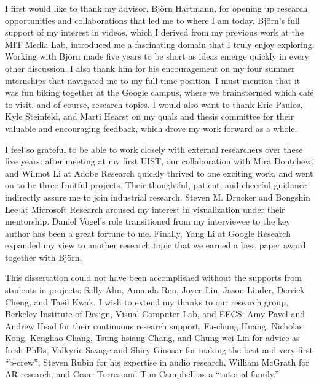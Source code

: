 \begin{acknowledgements}

%
I first would like to thank my advisor, Bj\"orn Hartmann, for opening up research opportunities and collaborations that led me to where I am today.
%
Bj\"orn's full support of my interest in videos, which I derived from my previous work at the MIT Media Lab, introduced me a fascinating domain that I truly enjoy exploring. Working with Bj\"orn made five years to be short as ideas emerge quickly in every other discussion. I also thank him for his encouragement on my four summer internships that navigated me to my full-time position. I must mention that it was fun biking together at the Google campus, where we brainstormed which caf\'{e} to visit, and of course, research topics.
I would also want to thank Eric Paulos, Kyle Steinfeld, and Marti Hearst on my quals and thesis committee for their valuable and encouraging feedback, which drove my work forward as a whole.

I feel so grateful to be able to work closely with external researchers over these five years: after meeting at my first UIST, our collaboration with Mira Dontcheva and Wilmot Li at Adobe Research quickly thrived to one exciting work, and went on to be three fruitful projects. Their thoughtful, patient, and cheerful guidance indirectly assure me to join industrial research.
%
Steven M. Drucker and Bongshin Lee at Microsoft Research aroused my interest in visualization under their mentorship.
%
Daniel Vogel's role transitioned from my interviewee to the key author has been a great fortune to me.
%
Finally, Yang Li at Google Research expanded my view to another research topic that we earned a best paper award together with Bj\"orn.

This dissertation could not have been accomplished without the supports from students in projects: Sally Ahn, Amanda Ren, Joyce Liu, Jason Linder, Derrick Cheng, and Taeil Kwak. I wish to extend my thanks to our research group, Berkeley Institute of Design, Visual Computer Lab, and EECS: Amy Pavel and Andrew Head for their continuous research support, Fu-chung Huang, Nicholas Kong, Kenghao Chang, Tsung-hsiang Chang, and Chung-wei Lin for advice as fresh PhDs, Valkyrie Savage and Shiry Ginosar for making the best and very first ``b-crew'', Steven Rubin for his expertise in audio research, William McGrath for AR research, and Cesar Torres and Tim Campbell as a ``tutorial family.''


\end{acknowledgements}
